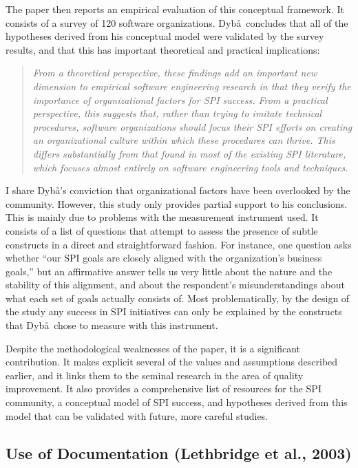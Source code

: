 The paper then reports an empirical evaluation of this conceptual framework. It consists of a survey of 120 software organizations. Dyb\aa~concludes that all of the hypotheses derived from his conceptual model were validated by the survey results, and that this has important theoretical and practical implications:

\begin{quote}
\emph{From a theoretical perspective, these findings add an important new dimension to empirical software engineering research in that they verify the importance of organizational factors for SPI success. From a practical perspective, this suggests that, rather than trying to imitate technical procedures, software organizations should focus their SPI efforts on creating an organizational culture within which these procedures can thrive. This differs substantially from that found in most of the existing SPI literature, which focuses almost entirely on software engineering tools and techniques.}
\end{quote}

I share Dyb\aa's conviction that organizational factors have been overlooked by the community. However, this study only provides partial support to his conclusions. This is mainly due to problems with the measurement instrument used. It consists of a list of questions that attempt to assess the presence of subtle constructs in a direct and straightforward fashion. For instance, one question asks whether ``our SPI goals are closely aligned with the organization's business goals,'' but an affirmative answer tells us very little about the nature and the stability of this alignment, and about the respondent's misunderstandings about what each set of goals actually consists of. Most problematically, by the design of the study any success in SPI initiatives can only be explained by the constructs that Dyb\aa~chose to measure with this instrument.

Despite the methodological weaknesses of the paper, it is a significant contribution. It makes explicit several of the values and assumptions described earlier, and it links them to the seminal research in the area of quality improvement. It also provides a comprehensive list of resources for the SPI community, a conceptual model of SPI success, and hypotheses derived from this model that can be validated with future, more careful studies.


\subsection{Use of Documentation (Lethbridge et al., 2003)}
\label{sec:Lethbridge}

